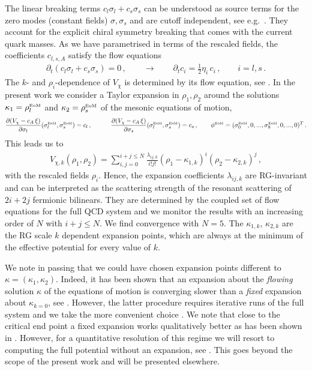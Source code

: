 \documentclass[reprint,twocolumn,superscriptaddress,preprintnumbers,amsmath,amssymb,aps,prd,floatfix]{revtex4-2}
\begin{document}
The linear breaking terms $c_l \sigma_l+c_s\sigma_s$ can be understood as source terms for the zero modes (constant fields) $\sigma,\sigma_s$ and are cutoff independent, see e.g.~\cite{Fu:2019hdw}. They account for the explicit chiral symmetry breaking that comes with the current quark masses. As we have parametrised   in terms of the rescaled fields, the coefficients $c_{l,s,A}$ satisfy 
the flow equations 
%
\begin{align} 
\partial_t \left( c_l \sigma_l+c_s\sigma_s\right) =0 \,,\qquad \longrightarrow\qquad \partial_t c_i = \frac12 \eta_i\,c_i\,,\qquad i=l,s\,.
\label{eq:Flowc_i}
\end{align}
%
The $k$- and $\rho_i$-dependence of $V_\chi$ is determined by its flow equation, see . In the present work we consider a Taylor expansion in $\rho_1,\rho_2$ around the solutions $\kappa_1=\rho_l^\textrm{\tiny{EoM}}$ and $\kappa_2= \rho_s^\textrm{\tiny{EoM}}$ of the mesonic equations of motion, 
%
\begin{align} 
	\frac{\partial ( V_\chi- c_A\, \xi)}{\partial \sigma_{l}}(\sigma^\textrm{\tiny{EoM}}_l, \sigma^\textrm{\tiny{EoM}}_s)=c_{l}\,, \qquad \quad \frac{\partial  ( V_\chi- c_A\, \xi)}{\partial \sigma_{s}}(\sigma^\textrm{\tiny{EoM}}_l, \sigma^\textrm{\tiny{EoM}}_s)=c_{s}\,, \qquad \phi^\textrm{\tiny{EoM}}=(\sigma_0^\textrm{\tiny{EoM}}, 0,...,\sigma_8^\textrm{\tiny{EoM}}, 0,...,0)^T\,.
	\label{eq:sigmaEoM}
\end{align} 
%
This leads us to 
%
\begin{align}
V_{\chi,k} (\rho_1,\rho_2)=\sum_{i,j=0}^{i+j\leq N} \frac{\lambda_{ij,k}}{i!j!}(\rho_1 -\kappa_{1,k})^i(\rho_2-\kappa_{2,k})^j\,,
\label{eq:TaylorVchi} 
\end{align}
% 
with the rescaled fields $\rho_i$. Hence, the expansion coefficients $\lambda_{ij,k}$ are RG-invariant and can be interpreted as the scattering strength of the resonant scattering of $2 i +2 j$ fermionic bilinears. They are determined by the coupled set of flow equations for the full QCD system and we monitor the results with an increasing order of $N$ with $i+j\leq N$. We find convergence with $N=5$. The $\kappa_{1,k}$, $\kappa_{2,k}$ are the RG scale $k$ dependent expansion points, which are always at the minimum of the effective potential for every value of $k$. 

We note in passing that we could have chosen expansion points different to $\kappa=(\kappa_1,\kappa_2)$. Indeed, it has been shown that an expansion about the \textit{flowing} solution $\kappa$ of the equations of motion is converging slower than a \textit{fixed} expansion about $\kappa_{k=0}$, see \cite{Pawlowski:2014zaa}. However, the latter procedure requires iterative runs of the full system and we take the more convenient choice . We note that close to the critical end point a fixed expansion works qualitatively better as has been shown in \cite{Pawlowski:2014zaa}. However, for a quantitative resolution of this regime we will resort to computing the full potential without an expansion, see \cite{Pawlowski:2025jpg}. This goes beyond the scope of the present work and will be presented elsewhere.  
\end{document}
